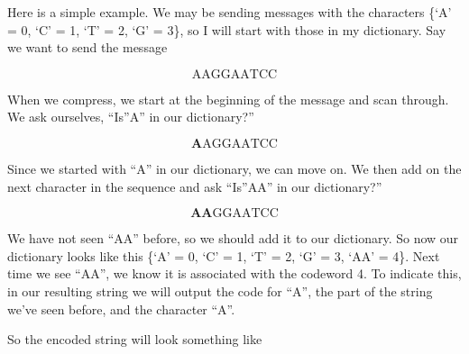 \documentclass[12pt,twoside]{reedthesis}
\begin{document}
Here is a simple example. We may be sending messages with the characters \{`A' = 0, `C' = 1, `T' = 2, `G' = 3\}, so I will start with those in my dictionary. Say we want to send the message

\[\text{AAGGAATCC}\]

When we compress, we start at the beginning of the message and scan through. We ask ourselves, ``Is''A'' in our dictionary?''

\[\textbf{A} \text{AGGAATCC}\]

Since we started with ``A'' in our dictionary, we can move on. We then add on the next character in the sequence and ask ``Is''AA'' in our dictionary?''

\[\textbf{AA} \text{GGAATCC}\]

We have not seen ``AA'' before, so we should add it to our dictionary. So now our dictionary looks like this \{`A' = 0, `C' = 1, `T' = 2, `G' = 3, `AA' = 4\}. Next time we see ``AA'', we know it is associated with the codeword 4. To indicate this, in our resulting string we will output the code for ``A'', the part of the string we've seen before, and the character ``A''.

So the encoded string will look something like
\end{document}
